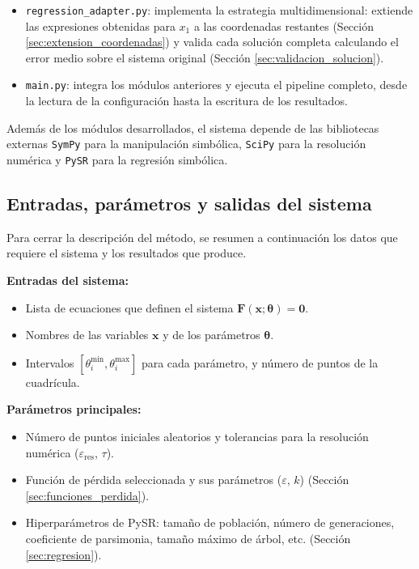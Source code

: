 \documentclass[12pt,a4paper]{article} \usepackage[utf8]{inputenc} \usepackage[spanish]{babel} \usepackage{amsmath, amssymb, amsthm} \usepackage{bm} \usepackage{float} \usepackage{longtable} \usepackage[hidelinks]{hyperref}
\newcommand{\xvec}{\mathbf{x}} \newcommand{\thetavec}{\boldsymbol{\theta}} \newcommand{\Fvec}{\mathbf{F}} \newcommand{\R}{\mathbb{R}} \newcommand{\norm}[1]{\left\lVert#1\right\rVert} \newcommand{\loss}{\mathcal{L}} \newcommand{\dataset}{\mathcal{D}} \newcommand{\jac}{\mathbf{J}}
\begin{document}
\begin{itemize}
    \item \texttt{regression\_adapter.py}: implementa la estrategia
    multidimensional: extiende las expresiones obtenidas para \(x_1\) a
    las coordenadas restantes (Sección \ref{sec:extension_coordenadas})
    y valida cada solución completa calculando el error medio sobre el
    sistema original (Sección \ref{sec:validacion_solucion}).

    \item \texttt{main.py}: integra los módulos anteriores y ejecuta el
    pipeline completo, desde la lectura de la configuración hasta la
    escritura de los resultados.
\end{itemize}

Además de los módulos desarrollados, el sistema depende de las
bibliotecas externas \texttt{SymPy} para la manipulación simbólica,
\texttt{SciPy} para la resolución numérica y \texttt{PySR} para la
regresión simbólica.

\subsection{Entradas, parámetros y salidas del sistema}
\label{sec:entradas_salidas_anexo}

Para cerrar la descripción del método, se resumen a continuación los
datos que requiere el sistema y los resultados que produce.

\textbf{Entradas del sistema:}
\begin{itemize}
    \item Lista de ecuaciones que definen el sistema
    \(\Fvec(\xvec; \thetavec) = \mathbf{0}\).
    \item Nombres de las variables \(\xvec\) y de los parámetros
    \(\thetavec\).
    \item Intervalos \([\theta_i^{\min}, \theta_i^{\max}]\) para cada
    parámetro, y número de puntos de la cuadrícula.
\end{itemize}

\textbf{Parámetros principales:}
\begin{itemize}
    \item Número de puntos iniciales aleatorios y tolerancias para la
    resolución numérica (\(\varepsilon_{\text{res}}\), \(\tau\)).
    \item Función de pérdida seleccionada y sus parámetros
    (\(\varepsilon\), \(k\)) (Sección \ref{sec:funciones_perdida}).
    \item Hiperparámetros de PySR: tamaño de población, número de
    generaciones, coeficiente de parsimonia, tamaño máximo de árbol,
    etc. (Sección \ref{sec:regresion}).
\end{itemize}
\end{document}

